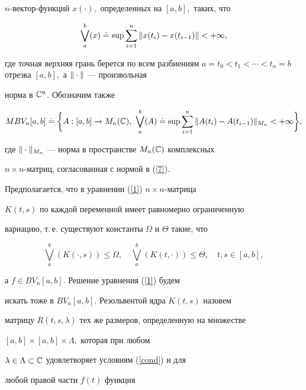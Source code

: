 $n$-вектор-функций $x(\cdot),$ определенных на $[a,b],$ таких, что


\begin{equation}\label{7}


\bigvee_a^b(x)\doteq\sup\sum_{i=1}^n\norm{x(t_i)-x(t_{i-1})}<+\infty,


\end{equation}


где точная верхняя грань берется по всем разбиениям $a=t_0<t_1<


\dotsb <t_n=b$ отрезка $[a,b],$ а $\norm{\cdot}$ --- произвольная


норма в $\Bbb C^n$. Обозначим также


$$


MBV_n[a,b]\doteq


\bigg\{A:[a,b]\to M_n(\C),\ \bigvee_a^b(A)\doteq


\sup\sum_{i=1}^n\norm{A(t_i)-A(t_{i-1})}_{M_n}<+\infty\bigg\},


$$


где $\| \cdot\|_{M_n}$ --- норма в пространстве $M_n(\Bbb C)$ комплексных


$n\times n$-матриц, согласованная с нормой в (\ref{7}).





Предполагается, что в уравнении (\ref{1}) $n\times n$-матрица


$K(t,s)$ по каждой переменной имеет равномерно ограниченную


вариацию, т.\,е. существуют константы $\Omega$ и $\Theta$ такие, что


\begin{equation}\label{cond}


\bigvee_a^b(K(\cdot,s))\leq\Omega,\quad


\bigvee_a^b(K(t,\cdot))\leq\Theta,\quad t,s\in[a,b],


\end{equation}


а $f\in BV_n[a,b]$. Решение уравнения (\ref{1}) будем


искать тоже в $BV_n[a,b].$ Резольвентой ядра $K(t,s)$ назовем


матрицу $R(t,s,\lambda)$ тех же размеров, определенную на множестве


$[a,b]\times[a,b]\times\Lambda,$ которая при любом


$\lambda\in\Lambda\subset \Bbb C$ удовлетворяет условиям (\ref{cond}) и для


любой правой части $f(t)$ функция


